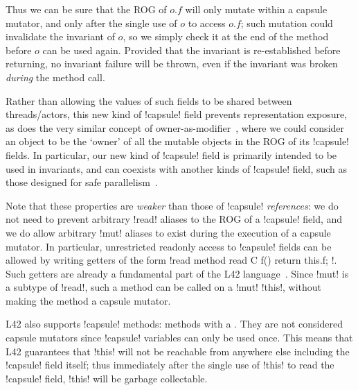 Thus we can be sure that the ROG of $o.f$ will only mutate within a capsule mutator, and only after the single use of $o$ to access $o.f$; such mutation could invalidate the invariant of $o$, so we simply check it at the end of the method before $o$ can be used again. Provided that the invariant is re-established before returning, no invariant failure will be thrown, even if the invariant was broken \emph{during} the method call.

 
Rather than allowing the values of such fields to be shared between threads/actors, this new kind of \Q!capsule! field prevents representation exposure, as does the very similar concept of owner-as-modifier~\cite{Dietl05universes:lightweight,10.1007/978-3-540-92188-2_4}, where we could consider an object to be the `owner' of all the mutable objects in the ROG of its \Q!capsule! fields. In particular, our new kind of \Q!capsule! field is primarily intended to be used in invariants,
and can coexists with another kinds of \Q!capsule! field, such as those designed for safe parallelism~\cite{GordonEtAl12,clebsch2015deny,GIANNINI2019145}.

Note that these properties are \emph{weaker} than those of \Q!capsule! \emph{references}: we do not need to prevent arbitrary \Q!read! aliases to the ROG of a \Q!capsule! field, and we do allow arbitrary \Q!mut! aliases  to exist during the execution of a capsule mutator. In particular, unrestricted readonly access to \Q!capsule! fields can be allowed by writing getters of the form \Q!read method read C f() { return this.f; }!. Such getters are already a fundamental part of the L42 language~\cite{DBLP:journals/programming/AroraSO19}. Since \Q!mut! is a subtype of \Q!read!, such a method can be called on a \Q!mut! \Q!this!, without making the method a capsule mutator.

L42 also supports \Q!capsule! methods: methods with a \Q@capsule@ \Q@this@. They are not considered capsule mutators since \Q!capsule! variables can only be used once. This means that L42 guarantees that \Q!this! will not be reachable from anywhere else including the \Q!capsule! field itself; thus immediately after the single use of \Q!this! to read the \Q!capsule! field, \Q!this! will be garbage collectable.

